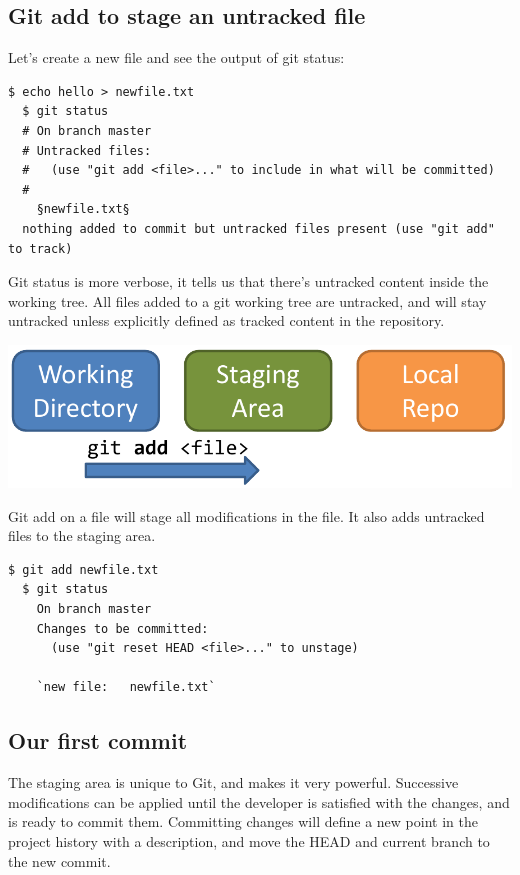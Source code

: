 \documentclass{../../common/tufte-latex/tufte-handout}
\begin{document}
\subsection{Git add to stage an untracked file}

Let's create a new file and see the output of git status:

\begin{lstlisting}[style=BashInputStyle]
  $ echo hello > newfile.txt
  $ git status
  # On branch master
  # Untracked files:
  #   (use "git add <file>..." to include in what will be committed)
  #
    §newfile.txt§
  nothing added to commit but untracked files present (use "git add" to track)
\end{lstlisting}

Git status is more verbose, it tells us that there's untracked content inside the working tree.
All files added to a git working tree are untracked, and will stay untracked unless explicitly defined as tracked content in the repository.

\begin{marginfigure}%
  \centering
  \includegraphics[width=\linewidth]{gitadd-schema.pdf}
  \label{fig:gitadd}
  \caption{Git add on a file will stage all modifications in the file. It also adds untracked files to the staging area.}
\end{marginfigure}

\begin{lstlisting}[style=BashInputStyle]
  $ git add newfile.txt
  $ git status
    On branch master
    Changes to be committed:
      (use "git reset HEAD <file>..." to unstage)
  
    `new file:   newfile.txt`
\end{lstlisting}

\subsection{Our first commit}

The staging area is unique to Git, and makes it very powerful.
Successive modifications can be applied until the developer is satisfied with the changes, and is ready to commit them.
Committing changes will define a new point in the project history with a description, and move the HEAD and current branch to the new commit.
\end{document}

